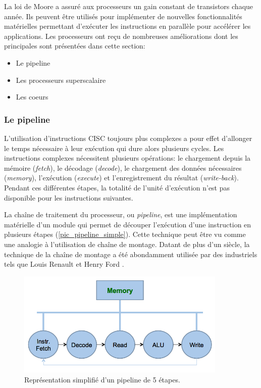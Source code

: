     La loi de Moore a assuré aux processeurs un gain constant de transistors chaque année. Ils peuvent être utilisés pour implémenter de nouvelles fonctionnalités matérielles permettant d'exécuter les instructions en parallèle pour accélérer les applications. Les processeurs ont reçu de nombreuses améliorations dont les principales sont présentées dans cette section: 
    \begin{itemize}
        \item Le pipeline
        \item Les processeurs superscalaire
        \item Les coeurs
    \end{itemize}


    \subsubsection{Le pipeline} \label{sec:pipeline}
        
        
        L'utilisation d'instructions CISC toujours plus complexes a pour effet d'allonger le temps nécessaire à leur exécution qui dure alors plusieurs cycles. Les instructions complexes nécessitent plusieurs opérations: le chargement depuis la mémoire (\textit{fetch}), le décodage (\textit{decode}), le chargement des données nécessaires (\textit{memory}), l'exécution (\textit{execute}) et l'enregistrement du résultat (\textit{write-back}). Pendant ces différentes étapes, la totalité de l'unité d'exécution n'est pas disponible pour les instructions suivantes. 
        
        La chaîne de traitement du processeur, ou \textit{pipeline}, est une implémentation matérielle d'un module qui permet de découper l'exécution d'une instruction en plusieurs étapes (\autoref{pic_pipeline_simple}). Cette technique peut être vu comme une analogie à l'utilisation de chaîne de montage. Datant de plus d'un siècle, la technique de la chaîne de montage a été abondamment utilisée par des industriels tels que Louis Renault et Henry Ford \cite{wolff1957entrepreneurs}.
        
        
        
        \begin{figure}
            \center
            \includegraphics[width=10cm]{images/Chapitre1/Neumann.png}
            \caption{\label{pic_pipeline_simple} Représentation simplifié d'un pipeline de 5 étapes.}
        \end{figure}

